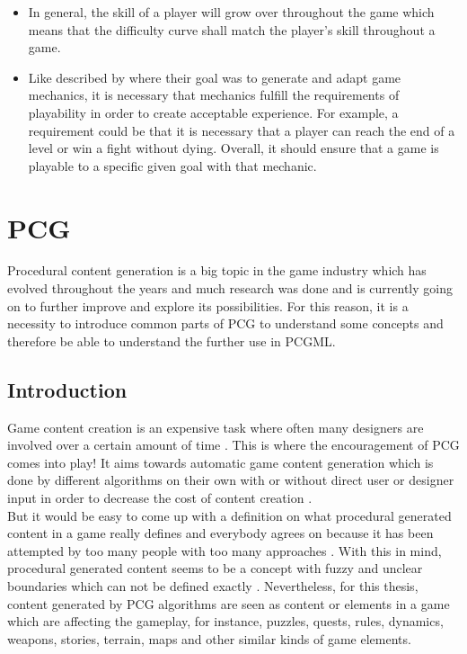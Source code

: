 \documentclass[MGS,Master,english]{twbook}%
\begin{document}
\begin{itemize}
	\item In general, the skill of a player will grow over throughout the game which means that the difficulty curve shall match the player's skill throughout a game. \cite{mechanic::gamasutra::DanielDoan}
	\item Like described by \cite{mechanic::generateAndAdaptingMechanics} where their goal was to generate and adapt game mechanics, it is necessary that mechanics fulfill the requirements of playability in order to create acceptable experience. For example, a requirement could be that it is necessary that a player can reach the end of a level or win a fight without dying. Overall, it should ensure that a game is playable to a specific given goal with that mechanic.
\end{itemize} 


%
%
\clearpage
\chapter{\acl{PCG}}
Procedural content generation is a big topic in the game industry which has evolved throughout the years and much research was done and is currently going on to further improve and explore its possibilities. For this reason, it is a necessity to introduce common parts of PCG to understand some concepts and therefore be able to understand the further use in \ac{PCGML}.

\section{Introduction}
Game content creation is an expensive task where often many designers are involved over a certain amount of time \cite{pcg::PCGinGameIndustry}. This is where the encouragement of \ac{PCG} comes into play! It aims towards automatic game content generation which is done by different algorithms on their own with or without direct user or designer input in order to decrease the cost of content creation \cite{pcg::PCGinGameIndustry} \cite{pcg::whatIsPCG}.\\
But it would be easy to come up with a definition on what procedural generated content in a game really defines and everybody agrees on because it has been attempted by too many people with too many approaches \cite{pcg::whatIsPCG}. With this in mind, procedural generated content seems to be a concept with fuzzy and unclear boundaries which can not be defined exactly \cite{pcg::whatIsPCG}. Nevertheless, for this thesis, content generated by PCG algorithms are seen as content or elements in a game which are affecting the gameplay, for instance, puzzles, quests, rules, dynamics, weapons, stories, terrain, maps and other similar kinds of game elements.
\end{document}
